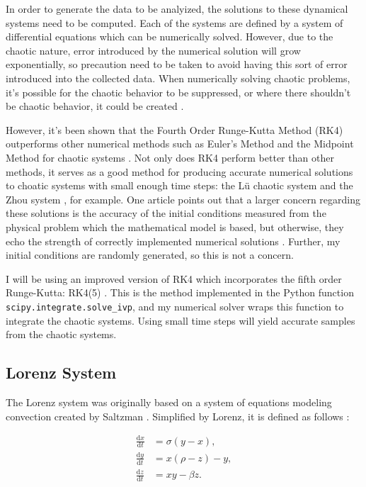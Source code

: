 \documentclass{article}
\newcommand{\der}[2][t]{\frac{\mathrm{d}#2}{\mathrm{d}#1}}
\begin{document}
In order to generate the data to be analyized, the solutions to these
dynamical systems need to be computed. Each of the systems are defined by a
system of differential equations which can be numerically solved. However,
due to the chaotic nature, error introduced by the numerical solution will
grow exponentially, so precaution need to be taken to avoid having this sort
of error introduced into the collected data. When numerically solving chaotic
problems, it's possible for the chaotic behavior to be suppressed, or where
there shouldn't be chaotic behavior, it could be created
\cite{corless1994good}.

However, it's been shown that the Fourth Order Runge-Kutta Method (RK4)
outperforms other numerical methods such as Euler's Method and the Midpoint
Method for chaotic systems \cite{zidan2011effect}. Not only does RK4 perform
better than other methods, it serves as a good method for producing accurate
numerical solutions to choatic systems with small enough time steps: the Lü
chaotic system \cite{mehdi2017using} and the Zhou system
\cite{roslan2013solving}, for example. One article points out that a larger
concern regarding these solutions is the accuracy of the initial conditions
measured from the physical problem which the mathematical model is based, but
otherwise, they echo the strength of correctly implemented numerical
solutions \cite{corless1994good}. Further, my initial conditions are randomly
generated, so this is not a concern.

I will be using an improved version of RK4 which incorporates the fifth order
Runge-Kutta: RK4(5) \cite{dormand1980family}. This is the method implemented
in the Python function \texttt{scipy.integrate.solve\_ivp}, and my numerical
solver wraps this function to integrate the chaotic systems. Using small time
steps will yield accurate samples from the chaotic systems.

\subsection{Lorenz System}
\label{sec:lorenz}

The Lorenz system was originally based on a system of equations modeling
convection created by Saltzman \cite{lorenz1963deterministic}
\cite{saltzman1962finite}. Simplified by Lorenz, it is defined as follows
\cite{lorenz1963deterministic}:

\begin{align}
    \der{x} &= \sigma (y - x), \nonumber \\
    \der{y} &= x (\rho - z) - y, \nonumber \\
    \der{z} &= x y - \beta z. \label{eq:lorenz_equation}
\end{align}
\end{document}
